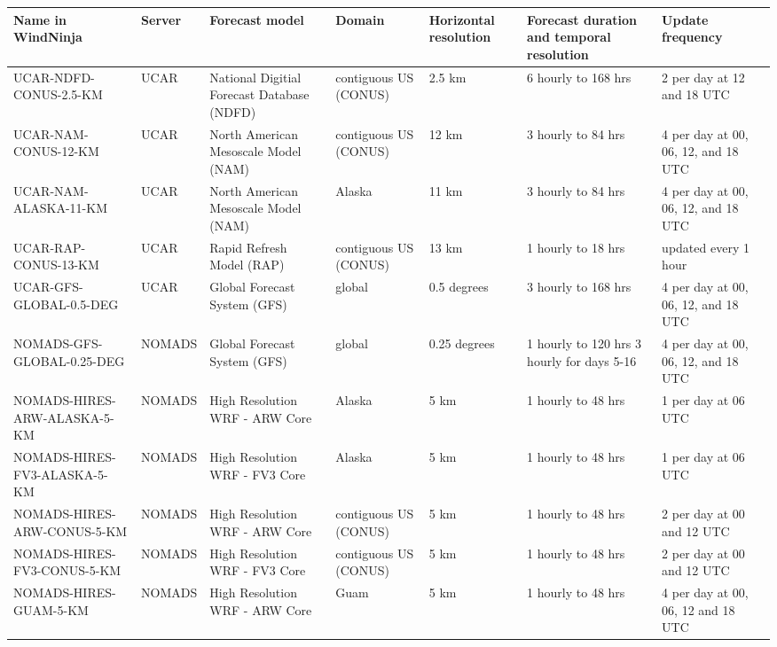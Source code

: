 \documentclass[12pt]{article}
\begin{document}
\begin{landscape}
\begin{longtable}[1]{|p{4.0cm}|p{2.0cm}|p{2.2cm}|p{2.0cm}|p{2.2cm}|p{3.4cm}|p{3.6cm}|}
\hline
\rowcolor{lightgray} Name in WindNinja & Server & Forecast model & Domain & Horizontal resolution & Forecast duration and temporal resolution & Update frequency\\
\hline
UCAR-NDFD-CONUS-2.5-KM & UCAR & National Digitial Forecast Database (NDFD) & contiguous US (CONUS) & 2.5 km & 6 hourly to 168 hrs & 2 per day at 12 and 18 UTC\\
\hline
UCAR-NAM-CONUS-12-KM & UCAR & North American Mesoscale Model (NAM) & contiguous US (CONUS) & 12 km & 3 hourly to 84 hrs & 4 per day at 00, 06, 12, and 18 UTC\\
\hline
UCAR-NAM-ALASKA-11-KM & UCAR & North American Mesoscale Model (NAM) & Alaska & 11 km & 3 hourly to 84 hrs & 4 per day at 00, 06, 12, and 18 UTC\\
\hline
UCAR-RAP-CONUS-13-KM & UCAR & Rapid Refresh Model (RAP) & contiguous US (CONUS) & 13 km & 1 hourly to 18 hrs & updated every 1 hour\\
\hline
UCAR-GFS-GLOBAL-0.5-DEG & UCAR & Global Forecast System (GFS) & global & 0.5 degrees & 3 hourly to 168 hrs & 4 per day at 00, 06, 12, and 18 UTC\\
\hline
NOMADS-GFS-GLOBAL-0.25-DEG & NOMADS & Global Forecast System (GFS) & global & 0.25 degrees & 1 hourly to 120 hrs 3 hourly for days 5-16 & 4 per day at 00, 06, 12, and 18 UTC\\
\hline
NOMADS-HIRES-ARW-ALASKA-5-KM & NOMADS & High Resolution WRF - ARW Core & Alaska & 5 km & 1 hourly to 48 hrs & 1 per day at 06 UTC\\
\hline
NOMADS-HIRES-FV3-ALASKA-5-KM & NOMADS & High Resolution WRF - FV3 Core & Alaska & 5 km & 1 hourly to 48 hrs & 1 per day at 06 UTC\\
\hline
NOMADS-HIRES-ARW-CONUS-5-KM & NOMADS & High Resolution WRF - ARW Core & contiguous US (CONUS) & 5 km & 1 hourly to 48 hrs & 2 per day at 00 and 12 UTC\\
\hline
NOMADS-HIRES-FV3-CONUS-5-KM & NOMADS & High Resolution WRF - FV3 Core & contiguous US (CONUS) & 5 km & 1 hourly to 48 hrs & 2 per day at 00 and 12 UTC\\
\hline
NOMADS-HIRES-GUAM-5-KM & NOMADS & High Resolution WRF - ARW Core & Guam & 5 km & 1 hourly to 48 hrs & 4 per day at 00, 06, 12 and 18 UTC\\

\end{longtable}
\end{landscape}
\end{document}
